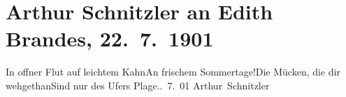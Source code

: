 

         
         \renewcommand{\erwaehntePersonen}{Personen: Georg Brandes, Edith Philipp}
         \renewcommand{\erwaehnteOrte}{Orte: Kopenhagen, Vahrn}
         \renewcommand{\erwaehnteWerke}{}
               \section[Arthur Schnitzler an Edith Brandes, 22. 7. 1901]{ Arthur Schnitzler an Edith Brandes, 22. 7. 1901}\nopagebreak{}\rehead{ }\begin{ledgroupsized}[t]{13cm}\normalsize\beginnumbering \toendnotes[C]{\smallbreak\pagebreak[2]} \stanza{}{\pb}In offner Flut auf leichtem Kahn\newverse{}An frischem Sommertage!\newverse{}Die Mücken, die dir wehgethan\newverse{}Sind nur des Ufers Plage.\stanzaend{}. 7. 01{ }\spacefill\mbox{Arthur Schnitzler}\pend{}
         
         \endnumbering{}\end{ledgroupsized}  \newcommand{\dateiname}{L01151}\newcommand{\titel}{Arthur Schnitzler an Edith Brandes, 22. 7. 1901}\newcommand{\editorInnen}{Martin Anton Müller und Gerd-Hermann Susen}
      